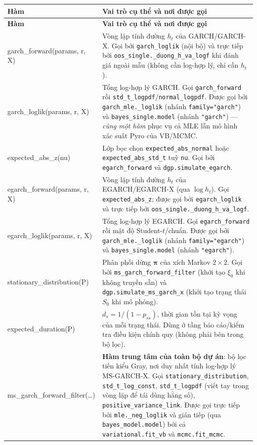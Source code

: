 \documentclass[11pt,a4paper]{article}
\newcommand{\code}[1]{\texttt{#1}}
\begin{document}
\begin{longtable}{@{}>{\ttfamily\scriptsize\raggedright\arraybackslash}p{5.0cm} >{\raggedright\arraybackslash}p{9.5cm}@{}}
\toprule
\textbf{\normalfont Hàm} & \textbf{Vai trò cụ thể và nơi được gọi} \\
\midrule
\endfirsthead
\toprule
\textbf{\normalfont Hàm} & \textbf{Vai trò cụ thể và nơi được gọi} \\
\midrule
\endhead
\bottomrule
\endfoot
garch\_forward(params, r, X) & Vòng lặp tính đường $h_t$ của GARCH/GARCH-X. Gọi bởi \code{garch\_loglik} (nội bộ) và trực tiếp bởi \code{oos\_single.\_duong\_h\_va\_logf} khi đánh giá ngoài mẫu (không cần log-hợp lý, chỉ cần $h_t$). \\
garch\_loglik(params, r, X) & Tổng log-hợp lý GARCH. Gọi \code{garch\_forward} rồi \code{std\_t\_logpdf}/\code{normal\_logpdf}. Được gọi bởi \code{garch\_mle.\_loglik} (nhánh \code{family="garch"}) và \code{bayes\_single.model} (nhánh \code{"garch"}) --- \emph{cùng một hàm} phục vụ cả MLE lẫn mô hình xác suất Pyro của VB/MCMC. \\
expected\_abs\_z(nu) & Lớp bọc chọn \code{expected\_abs\_normal} hoặc \code{expected\_abs\_std\_t} tuỳ \code{nu}. Gọi bởi \code{egarch\_forward} và \code{dgp.simulate\_egarch}. \\
egarch\_forward(params, r, X) & Vòng lặp tính đường $h_t$ của EGARCH/EGARCH-X (qua $\log h_t$). Gọi \code{expected\_abs\_z}; được gọi bởi \code{egarch\_loglik} và trực tiếp bởi \code{oos\_single.\_duong\_h\_va\_logf}. \\
egarch\_loglik(params, r, X) & Tổng log-hợp lý EGARCH. Gọi \code{egarch\_forward} rồi mật độ Student-$t$/chuẩn. Được gọi bởi \code{garch\_mle.\_loglik} (nhánh \code{family="egarch"}) và \code{bayes\_single.model} (nhánh \code{"egarch"}). \\
stationary\_distribution(P) & Phân phối dừng $\boldsymbol\pi$ của xích Markov $2\times2$. Gọi bởi \code{ms\_garch\_forward\_filter} (khởi tạo $\xi_0$ khi không truyền sẵn) và \code{dgp.simulate\_ms\_garch\_x} (khởi tạo trạng thái $S_0$ khi mô phỏng). \\
expected\_duration(P) & $d_s=1/(1-p_{ss})$, thời gian tồn tại kỳ vọng của mỗi trạng thái. Dùng ở tầng báo cáo/kiểm tra điều kiện chính quy (không phải bên trong bộ lọc). \\
ms\_garch\_forward\_filter(\ldots) & \textbf{Hàm trung tâm của toàn bộ dự án}: bộ lọc tiến kiểu Gray, nơi duy nhất tính log-hợp lý MS-GARCH-X. Gọi \code{stationary\_distribution}, \code{std\_t\_log\_const}, \code{std\_t\_logpdf} (viết tay trong vòng lặp để tái dùng hằng số), \code{positive\_variance\_link}. Được gọi trực tiếp bởi \code{mle.\_neg\_loglik} và gián tiếp (qua \code{bayes\_model.model}) bởi cả \code{variational.fit\_vb} và \code{mcmc.fit\_mcmc}. \\

\end{longtable}
\end{document}
